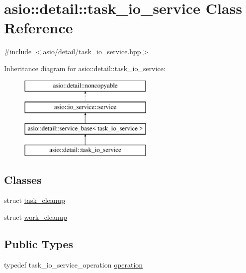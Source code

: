 \hypertarget{classasio_1_1detail_1_1task__io__service}{}\section{asio\+:\+:detail\+:\+:task\+\_\+io\+\_\+service Class Reference}
\label{classasio_1_1detail_1_1task__io__service}


{\ttfamily \#include $<$asio/detail/task\+\_\+io\+\_\+service.\+hpp$>$}

Inheritance diagram for asio\+:\+:detail\+:\+:task\+\_\+io\+\_\+service\+:\begin{figure}[H]
\begin{center}
\leavevmode
\includegraphics[height=4.000000cm]{classasio_1_1detail_1_1task__io__service}
\end{center}
\end{figure}
\subsection*{Classes}
\begin{DoxyCompactItemize}
\item 
struct \hyperlink{structasio_1_1detail_1_1task__io__service_1_1task__cleanup}{task\+\_\+cleanup}
\item 
struct \hyperlink{structasio_1_1detail_1_1task__io__service_1_1work__cleanup}{work\+\_\+cleanup}
\end{DoxyCompactItemize}
\subsection*{Public Types}
\begin{DoxyCompactItemize}
\item 
typedef task\+\_\+io\+\_\+service\+\_\+operation \hyperlink{classasio_1_1detail_1_1task__io__service_abb8a2a1b24b3cbf9afd8d19bf4bd6929}{operation}
\end{DoxyCompactItemize}
